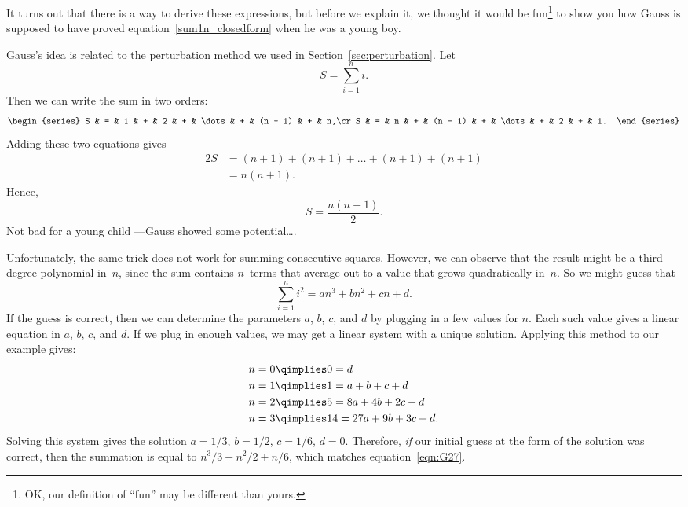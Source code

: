 It turns out that there is a way to derive these expressions, but
before we explain it, we thought it would be fun\footnote{OK, our
  definition of ``fun'' may be different than yours.} to show you how
Gauss is supposed to have proved equation~\ref{sum1n_closedform} when
he was a young boy.

\iffalse
\footnote{We suspect that Gauss was probably not an ordinary boy.}
\fi

Gauss's idea is related to the perturbation method we used in
Section~\ref{sec:perturbation}.  Let
\[
    S = \sum_{i = 1}^n i.
\]
Then we can write the sum in two orders:
\[
    \begin{series}
        S & = & 1 & + & 2       & + & \dots & + & (n - 1) & + & n,\cr
        S & = & n & + & (n - 1) & + & \dots & + & 2       & + & 1.
    \end{series}
\]
Adding these two equations gives
\begin{align*}
    2S  & = (n + 1) + (n + 1) + \dots + (n + 1) + (n + 1) \\
        & = n (n + 1).
\end{align*}
Hence,
\[
    S = \frac{n (n + 1)}{2}.
\]
Not bad for a young child ---Gauss showed some potential\dots.

Unfortunately, the same trick does not work for summing consecutive
squares.  However, we can observe that the result might be a
third-degree polynomial in~$n$, since the sum contains $n$~terms that
average out to a value that grows quadratically in~$n$.  So we might
guess that
\[
    \sum_{i=1}^n i^2 = an^3 + bn^2 + cn + d.
\]
If the guess is correct, then we can determine the parameters $a$,
$b$, $c$, and $d$ by plugging in a few values for $n$.  Each such
value gives a linear equation in $a$, $b$, $c$, and $d$.  If we plug
in enough values, we may get a linear system with a unique solution.
Applying this method to our example gives:
\begin{align*}
n = 0 & \qimplies  0 = d \\
n = 1 & \qimplies  1 = a + b + c + d \\
n = 2 & \qimplies  5 = 8a + 4b + 2c + d \\
n = 3 & \qimplies  14 = 27a + 9b + 3c + d.
\end{align*}
Solving this system gives the solution $a = 1/3$, $b = 1/2$, $c =
1/6$, $d = 0$.  Therefore, \emph{if} our initial guess at the form of
the solution was correct, then the summation is equal to $n^3/3 +
n^2/2 + n/6$, which matches equation~\ref{eqn:G27}.

